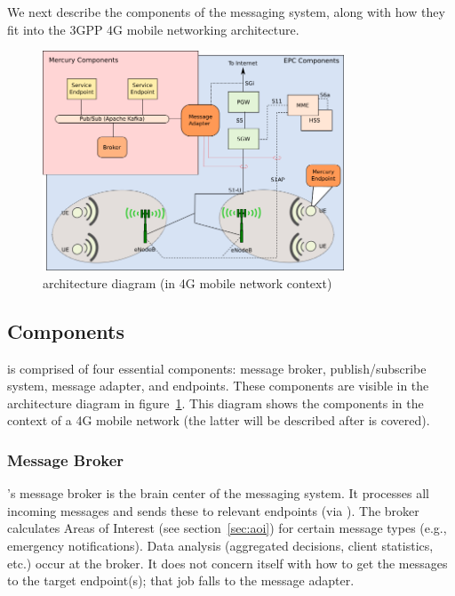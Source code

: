 We next describe the components of the \name messaging system, along
with how they fit into the 3GPP 4G mobile networking architecture.

\begin{figure}[ht]
  \centering
  \includegraphics[width=0.8\textwidth]{figs/mercury-arch.png}
  \caption{\name architecture diagram (in 4G mobile network context)}
  \label{fig:arch}
\end{figure}

\subsection{\name Components}

\name is comprised of four essential components: message broker,
publish/subscribe system, message adapter, and endpoints.  These
components are visible in the architecture diagram in
figure~\ref{fig:arch}. This diagram shows the \name components
in the context of a 4G mobile network (the latter will be described
after \name is covered).

\subsubsection{Message Broker}

\name's message broker is the brain center of the messaging
system. It processes all incoming messages and sends these to relevant
endpoints (via \pubsub). The broker calculates Areas of Interest (see
section~\ref{sec:aoi}) for certain message types (e.g., emergency
notifications).  Data analysis (aggregated decisions, client
statistics, etc.) occur at the broker. It does not concern itself with
how to get the messages to the target endpoint(s); that job falls to
the \name message adapter.

